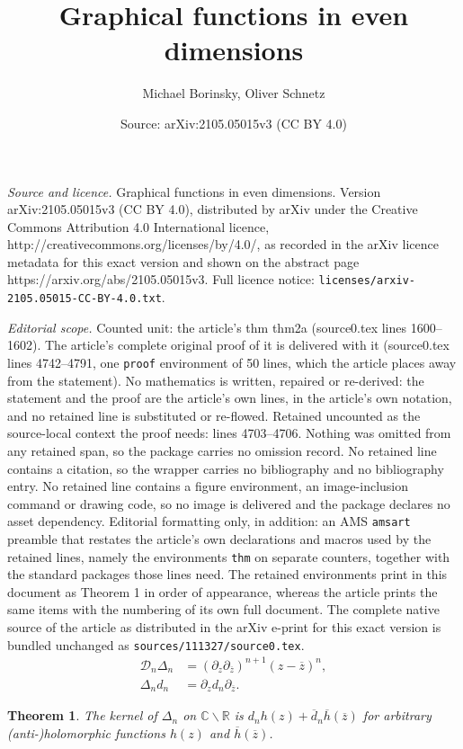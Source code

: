\documentclass[10pt,a4paper]{amsart}
\title{Graphical functions in even dimensions}
\author{Michael Borinsky, Oliver Schnetz}
\date{Source: arXiv:2105.05015v3 (CC BY 4.0)}
\newtheorem{thm}{Theorem}
\newcommand{\CC}{{\mathbb C}}
\newcommand{\RR}{{\mathbb R}}
\newcommand{\ddd}{{\overline{d}}}
\newcommand{\hh}{{\overline{h}}}
\newcommand{\sD}{\mathcal{D}}
\newcommand{\zz}{{\overline{z}}}
\begin{document}
\maketitle

\noindent\emph{Source and licence.} Graphical functions in even dimensions. Version arXiv:2105.05015v3 (CC BY 4.0), distributed by arXiv under the Creative Commons Attribution 4.0 International licence, http://creativecommons.org/licenses/by/4.0/, as recorded in the arXiv licence metadata for this exact version and shown on the abstract page https://arxiv.org/abs/2105.05015v3. Full licence notice: \texttt{licenses/arxiv-2105.05015-CC-BY-4.0.txt}.\par\smallskip

\noindent\textit{Editorial scope.} Counted unit: the article's thm thm2a (source0.tex lines 1600--1602). The article's complete original proof of it is delivered with it (source0.tex lines 4742--4791, one \texttt{proof} environment of 50 lines, which the article places away from the statement). No mathematics is written, repaired or re-derived: the statement and the proof are the article's own lines, in the article's own notation, and no retained line is substituted or re-flowed.  Retained uncounted as the source-local context the proof needs: lines 4703--4706.  Nothing was omitted from any retained span, so the package carries no omission record.  No retained line contains a citation, so the wrapper carries no bibliography and no bibliography entry.  No retained line contains a figure environment, an image-inclusion command or drawing code, so no image is delivered and the package declares no asset dependency.  Editorial formatting only, in addition: an AMS \texttt{amsart} preamble that restates the article's own declarations and macros used by the retained lines, namely the environments \texttt{thm} on separate counters, together with the standard packages those lines need.  The retained environments print in this document as Theorem 1 in order of appearance, whereas the article prints the same items with the numbering of its own full document.  The complete native source of the article as distributed in the arXiv e-print for this exact version is bundled unchanged as \texttt{sources/111327/source0.tex}.
\begin{align}\label{eqprop4}
\sD_n\Delta_n&=(\partial_z\partial_\zz)^{n+1}(z-\zz)^n,\nonumber\\
\Delta_nd_n&=\partial_zd_n\partial_\zz.
\end{align}

\begin{thm}\label{thm2a}
The kernel of $\Delta_n$ on $\CC\backslash\RR$ is $d_nh(z)+\ddd_n\hh(\zz)$ for arbitrary (anti-)holomorphic functions $h(z)$ and $\hh(\zz)$.
\end{thm}
\end{document}
